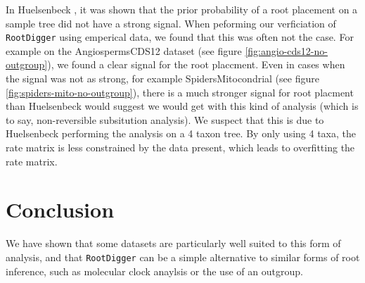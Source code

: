 \documentclass{article}
\newcommand{\RootDiggertt}{\texttt{RootDigger}}
\begin{document}
In Huelsenbeck \cite{huelsenbeck_inferring_2002}, it was shown that the prior
probability of a root placement on a sample tree did not have a strong signal.
When peforming our verficiation of \RootDiggertt{} using emperical data, we
found that this was often not the case. For example on the AngiospermsCDS12
dataset (see figure \ref{fig:angio-cds12-no-outgroup}), we found a clear signal
for the root placcment. Even in cases when the signal was not as strong, for
example SpidersMitocondrial (see figure \ref{fig:spiders-mito-no-outgroup}),
there is a much stronger signal for root placment than Huelsenbeck would suggest
we would get with this kind of analysis (which is to say, non-reversible
subsitution analysis). We suspect that this is due to Huelsenbeck performing the
analysis on a 4 taxon tree. By only using 4 taxa, the rate matrix is less
constrained by the data present, which leads to overfitting the rate matrix. 



\section{Conclusion}

We have shown that some datasets are particularly well suited to this form of
analysis, and that \RootDiggertt{} can be a simple alternative to similar forms
of root inference, such as molecular clock anaylsis or the use of an outgroup.



\end{document}
